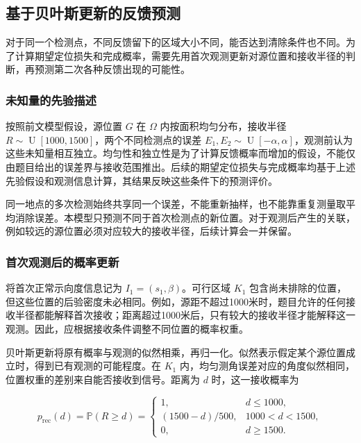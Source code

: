 \documentclass[UTF8,a4paper,zihao=-4,fontset=none]{ctexart}
\begin{document}
\subsection{基于贝叶斯更新的反馈预测}

对于同一个检测点，不同反馈留下的区域大小不同，能否达到清除条件也不同。为了计算期望定位损失和完成概率，需要先用首次观测更新对源位置和接收半径的判断，再预测第二次各种反馈出现的可能性。

\subsubsection{未知量的先验描述}

按照前文模型假设，源位置 \(G\) 在 \(\Omega\) 内按面积均匀分布，接收半径 \(R\sim\operatorname{U}[1000,1500]\)，两个不同检测点的误差 \(E_1,E_2\sim\operatorname{U}[-\alpha,\alpha]\)，观测前认为这些未知量相互独立。均匀性和独立性是为了计算反馈概率而增加的假设，不能仅由题目给出的误差界与接收范围推出。后续的期望定位损失与完成概率均基于上述先验假设和观测信息计算，其结果反映这些条件下的预测评价。

同一地点的多次检测始终共享同一个误差，不能重新抽样，也不能靠重复测量取平均消除误差。本模型只预测不同于首次检测点的新位置。对于观测后产生的关联，例如较远的源位置必须对应较大的接收半径，后续计算会一并保留。

\subsubsection{首次观测后的概率更新}

将首次正常示向度信息记为 \(I_1=(s_1,\beta)\)。可行区域 \(K_1\) 包含尚未排除的位置，但这些位置的后验密度未必相同。例如，源距不超过1000米时，题目允许的任何接收半径都能解释首次接收；距离超过1000米后，只有较大的接收半径才能解释这一观测。因此，应根据接收条件调整不同位置的概率权重。

贝叶斯更新将原有概率与观测的似然相乘，再归一化。似然表示假定某个源位置成立时，得到已有观测的可能程度。在 \(K_1\) 内，均匀测角误差对应的角度似然相同，位置权重的差别来自能否接收到信号。距离为 \(d\) 时，这一接收概率为

\begin{equation}
 p_{\mathrm{rec}}(d)=\mathbb{P}(R\ge d)=
 \begin{cases}
 1,&d\le1000,\\
 (1500-d)/500,&1000<d<1500,\\
 0,&d\ge1500.
 \end{cases}
\label{eq:q2-pair-weight}
\end{equation}
\end{document}
